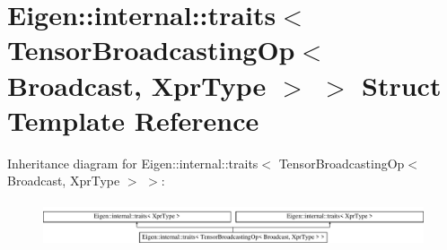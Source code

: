 \hypertarget{struct_eigen_1_1internal_1_1traits_3_01_tensor_broadcasting_op_3_01_broadcast_00_01_xpr_type_01_4_01_4}{}\section{Eigen\+:\+:internal\+:\+:traits$<$ Tensor\+Broadcasting\+Op$<$ Broadcast, Xpr\+Type $>$ $>$ Struct Template Reference}
\label{struct_eigen_1_1internal_1_1traits_3_01_tensor_broadcasting_op_3_01_broadcast_00_01_xpr_type_01_4_01_4}
Inheritance diagram for Eigen\+:\+:internal\+:\+:traits$<$ Tensor\+Broadcasting\+Op$<$ Broadcast, Xpr\+Type $>$ $>$\+:\begin{figure}[H]
\begin{center}
\leavevmode
\includegraphics[height=1.314554cm]{struct_eigen_1_1internal_1_1traits_3_01_tensor_broadcasting_op_3_01_broadcast_00_01_xpr_type_01_4_01_4}
\end{center}
\end{figure}
